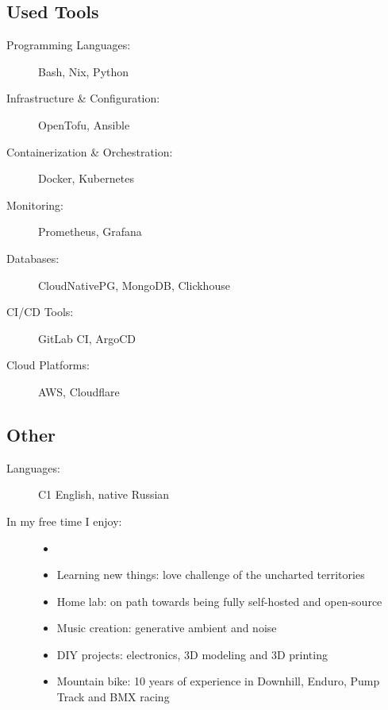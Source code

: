 \documentclass[10pt]{report}
\begin{document}
\goodbreak

\subsection*{Used Tools}
\begin{description}
  \item[Programming Languages:]
        Bash, Nix, Python
  \item[Infrastructure \& Configuration:]
        OpenTofu, Ansible
  \item[Containerization \& Orchestration:]
        Docker, Kubernetes
  \item[Monitoring:]
        Prometheus, Grafana
  \item[Databases:]
        CloudNativePG, MongoDB, Clickhouse
  \item[CI/CD Tools:]
        GitLab CI, ArgoCD
  \item[Cloud Platforms:]
        AWS, Cloudflare
\end{description}

\subsection*{Other}
\begin{description}
  \item[Languages:]
        C1 English, native Russian
  \item[In my free time I enjoy:]
        \begin{itemize}
          \item[]
          \item[--] Learning new things: love challenge of the uncharted territories
          \item[--] Home lab: on path towards being fully self-hosted and open-source
          \item[--] Music creation: generative ambient and noise
          \item[--] DIY projects: electronics, 3D modeling and 3D printing
          \item[--] Mountain bike: 10 years of experience in Downhill, Enduro, Pump Track and BMX racing
        \end{itemize}

\end{description}
\end{document}
